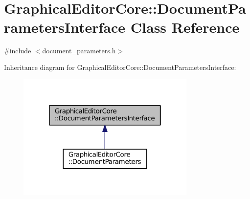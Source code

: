 \hypertarget{classGraphicalEditorCore_1_1DocumentParametersInterface}{}\section{Graphical\+Editor\+Core\+:\+:Document\+Parameters\+Interface Class Reference}
\label{classGraphicalEditorCore_1_1DocumentParametersInterface}


{\ttfamily \#include $<$document\+\_\+parameters.\+h$>$}



Inheritance diagram for Graphical\+Editor\+Core\+:\+:Document\+Parameters\+Interface\+:
\nopagebreak
\begin{figure}[H]
\begin{center}
\leavevmode
\includegraphics[width=250pt]{classGraphicalEditorCore_1_1DocumentParametersInterface__inherit__graph}
\end{center}
\end{figure}
